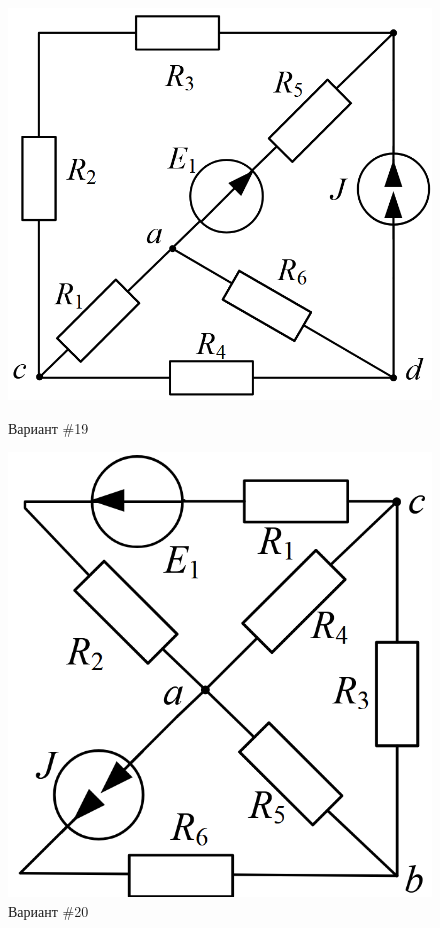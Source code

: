 \begin{figure}[H]
    \centering
    \begin{minipage}{0.48\textwidth}
        \centering
        \includegraphics[width=\textwidth]{images/19_task.png}
        \caption{Вариант \#19}
        \label{fig:task_19}
    \end{minipage}
    \hfill
    \begin{minipage}{0.48\textwidth}
        \centering
        \includegraphics[width=\textwidth]{images/20_task.png}
        \caption{Вариант \#20}
        \label{fig:task_20}
    \end{minipage}
\end{figure}

